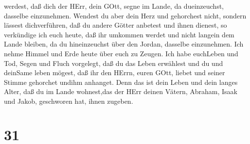 werdest, daß dich der HErr, dein GOtt, segne im Lande, da dueinzeuchst,
dasselbe einzunehmen.  Wendest du aber dein Herz und
gehorchest nicht, sondern lässest dichverführen, daß du andere Götter
anbetest und ihnen dienest,  so verkündige ich euch heute,
daß ihr umkommen werdet und nicht langein dem Lande bleiben, da du
hineinzeuchst über den Jordan, dasselbe einzunehmen.  Ich
nehme Himmel und Erde heute über euch zu Zeugen. Ich habe euchLeben und
Tod, Segen und Fluch vorgelegt, daß du das Leben erwählest und du und
deinSame leben mögest,  daß ihr den HErrn, euren GOtt,
liebet und seiner Stimme gehorchet undihm anhanget. Denn das ist dein
Leben und dein langes Alter, daß du im Lande wohnest,das der HErr deinen
Vätern, Abraham, Isaak und Jakob, geschworen hat, ihnen zugeben.

\hypertarget{section-30}{%
\section{31}\label{section-30}}

